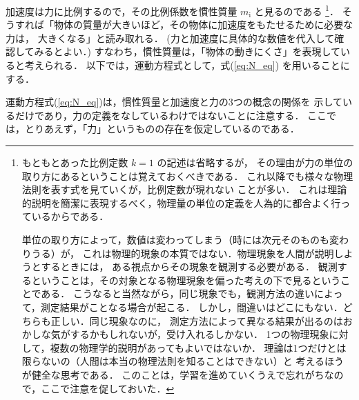                 加速度は力に比例するので，その比例係数を慣性質量 $m_{\mathrm{i}}$ と見るのである
                    \footnote{
                        もともとあった比例定数 $k=1$ の記述は省略するが，
                        その理由が力の単位の取り方にあるということは覚えておくべきである．
                        これ以降でも様々な物理法則を表す式を見ていくが，比例定数が現れない
                        ことが多い．
                        これは理論的説明を簡潔に表現するべく，物理量の単位の定義を人為的に都合よく行っているからである．

                        単位の取り方によって，数値は変わってしまう（時には次元そのものも変わりうる）が，
                        これは物理的現象の本質ではない．物理現象を人間が説明しようとするときには，
                        ある視点からその現象を観測する必要がある．
                        観測するということは，その対象となる物理現象を偏った考えの下で見るということである．
                        こうなると当然ながら，同じ現象でも，観測方法の違いによって，測定結果がことなる場合が起こる．
                        しかし，間違いはどこにもない．どちらも正しい．同じ現象なのに，
                        測定方法によって異なる結果が出るのはおかしな気がするかもしれないが，受け入れるしかない．
                        1つの物理現象に対して，複数の物理学的説明があってもよいではないか．
                        理論は1つだけとは限らないの（人間は本当の物理法則を知ることはできない）と
                        考えるほうが健全な思考である．
                        このことは，学習を進めていくうえで忘れがちなので，ここで注意を促しておいた．
                    }．
                そうすれば「物体の質量が大きいほど，その物体に加速度をもたせるために必要な力は，
                大きくなる」と読み取れる．
                (力と加速度に具体的な数値を代入して確認してみるとよい．)
                すなわち，慣性質量は，「物体の動きにくさ」を表現していると考えられる．
                以下では，運動方程式として，式(\ref{eq:N_eq}) を用いることにする．

                運動方程式(\ref{eq:N_eq})は，慣性質量と加速度と力の3つの概念の関係を
                示しているだけであり，力の定義をなしているわけではないことに注意する．
                ここでは，とりあえず，「力」というものの存在を仮定しているのである．

